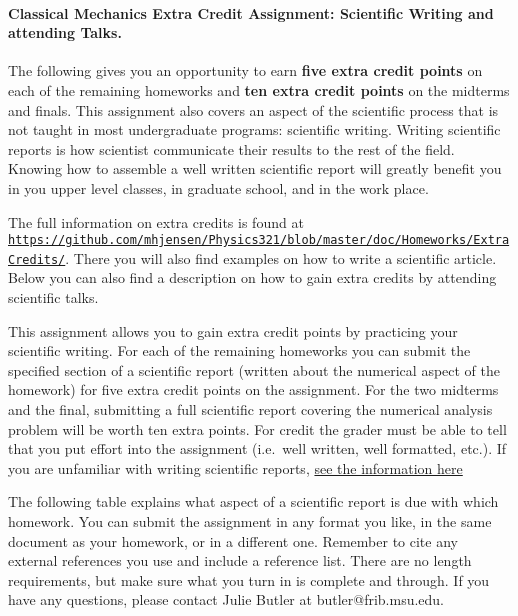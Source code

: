 \documentclass[%
oneside,                 %
final,                   %
10pt]{article}
\begin{document}
\paragraph{Classical Mechanics Extra Credit Assignment: Scientific Writing and attending Talks.}
The following gives you an opportunity to earn \textbf{five extra credit
points} on each of the remaining homeworks and \textbf{ten extra credit points}
on the midterms and finals.  This assignment also covers an aspect of
the scientific process that is not taught in most undergraduate
programs: scientific writing.  Writing scientific reports is how
scientist communicate their results to the rest of the field.  Knowing
how to assemble a well written scientific report will greatly benefit
you in you upper level classes, in graduate school, and in the work
place.

The full information on extra credits is found at \href{{https://github.com/mhjensen/Physics321/blob/master/doc/Homeworks/ExtraCredits/}}{\nolinkurl{https://github.com/mhjensen/Physics321/blob/master/doc/Homeworks/ExtraCredits/}}. There you will also find examples on how to write a scientific article. 
Below you can also find a description on how to gain extra credits by attending scientific talks.

This assignment allows you to gain extra credit points by practicing
your scientific writing.  For each of the remaining homeworks you can
submit the specified section of a scientific report (written about the
numerical aspect of the homework) for five extra credit points on the
assignment.  For the two midterms and the final, submitting a full
scientific report covering the numerical analysis problem will be
worth ten extra points.  For credit the grader must be able to tell
that you put effort into the assignment (i.e.~well written, well
formatted, etc.).  If you are unfamiliar with writing scientific
reports, \href{{https://github.com/mhjensen/Physics321/blob/master/doc/Homeworks/ExtraCredits/IntroductionScientificWriting.md}}{see the information here}

The following table explains what aspect of a scientific report is due
with which homework.  You can submit the assignment in any format you
like, in the same document as your homework, or in a different one.
Remember to cite any external references you use and include a
reference list.  There are no length requirements, but make sure what
you turn in is complete and through.  If you have any questions,
please contact Julie Butler at butler@frib.msu.edu.
\end{document}
